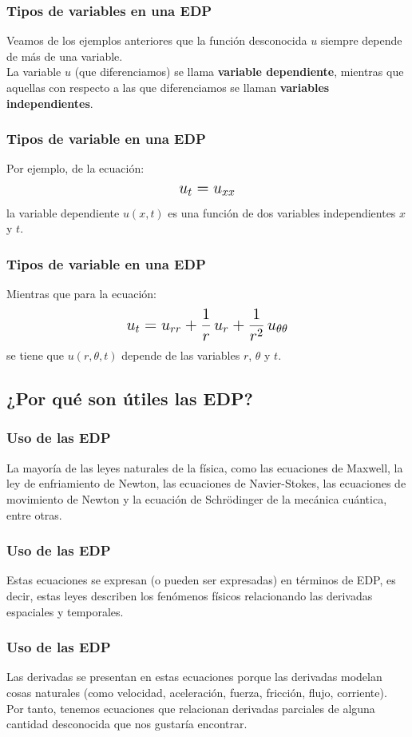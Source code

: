 \documentclass[12pt]{beamer}
\begin{document}
\begin{frame}
\frametitle{Tipos de variables en una EDP}
Veamos de los ejemplos anteriores que la función desconocida $u$ siempre depende de más de una variable.
\\
\bigskip
\pause
La variable $u$ (que diferenciamos) se llama \textbf{variable dependiente}, mientras que aquellas con respecto a las que diferenciamos se llaman \textbf{variables independientes}.
\end{frame}
\begin{frame}
\frametitle{Tipos de variable en una EDP}
Por ejemplo, de la ecuación:
\pause
\begin{align*}
\text{\Large{$u_{t} = u_{xx}$}}
\end{align*}
la variable dependiente $u(x, t)$ es una función de dos variables independientes $x$ y $t$.
\end{frame}
\begin{frame}
\frametitle{Tipos de variable en una EDP}
Mientras que para la ecuación:
\pause
\begin{align*}
\text{\Large{$u_{t} = u_{rr} + \dfrac{1}{r} \, u_{r} + \dfrac{1}{r^{2}} \, u_{\theta \theta}$}}
\end{align*}
se tiene que $u(r, \theta, t)$ depende de las variables $r$, $\theta$ y $t$.
\end{frame}

\subsection{¿Por qué son útiles las EDP?}

\begin{frame}
\frametitle{Uso de las EDP}
La mayoría de las leyes naturales de la física, como las ecuaciones de Maxwell, \pause la ley de enfriamiento de Newton, \pause las ecuaciones de Navier-Stokes, \pause las ecuaciones de movimiento de Newton \pause y la ecuación de Schrödinger de la mecánica cuántica, entre otras.
\end{frame}
\begin{frame}
\frametitle{Uso de las EDP}
Estas ecuaciones se expresan (o pueden ser expresadas) en términos de EDP, \pause es decir, estas leyes describen los fenómenos físicos relacionando las derivadas espaciales y temporales.
\end{frame}
\begin{frame}
\frametitle{Uso de las EDP}
Las derivadas se presentan en estas ecuaciones porque las derivadas modelan cosas naturales (como velocidad, aceleración, fuerza, fricción, flujo, corriente).
\\
\bigskip
\pause
Por tanto, tenemos ecuaciones que relacionan derivadas parciales de alguna cantidad desconocida que nos gustaría encontrar.
\end{frame}
\end{document}
